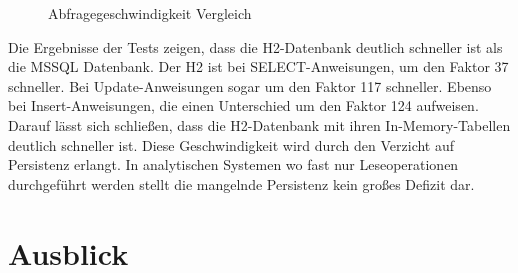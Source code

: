 \begin{figure}[htbp]
\centering
{}\hfill
{}\hfill
{}
\caption{Abfragegeschwindigkeit Vergleich}
\label{ergebniss_vergleich}
\end{figure}

Die Ergebnisse der Tests zeigen, dass die H2-Datenbank deutlich schneller ist als die MSSQL Datenbank. Der H2 ist bei SELECT-Anweisungen, um den Faktor 37 schneller. Bei Update-Anweisungen sogar um den Faktor 117 schneller. Ebenso bei Insert-Anweisungen, die einen Unterschied um den Faktor 124 aufweisen. Darauf lässt sich schließen, dass die H2-Datenbank mit ihren In-Memory-Tabellen deutlich schneller ist. Diese Geschwindigkeit wird durch den Verzicht auf Persistenz erlangt. In analytischen Systemen wo fast nur Leseoperationen durchgeführt werden stellt die mangelnde Persistenz kein großes Defizit dar. 

\section{Ausblick}
\label{ch:Ergebnis:sec:Ausblick}


